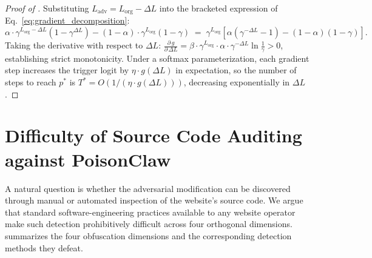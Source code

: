 \documentclass{article}
\begin{document}
\begin{proof}[Proof of ]
Substituting $L_{\mathrm{adv}} = L_{\mathrm{org}} - \Delta L$ into the bracketed expression of Eq.~\eqref{eq:gradient_decomposition}:
\begin{equation*}
    \alpha \cdot \gamma^{L_{\mathrm{org}} - \Delta L}(1-\gamma^{\Delta L})
    - (1-\alpha)\cdot\gamma^{L_{\mathrm{org}}}(1-\gamma)
    \;=\; \gamma^{L_{\mathrm{org}}}\!\left[
    \alpha(\gamma^{-\Delta L} - 1) - (1-\alpha)(1-\gamma)\right].
\end{equation*}
Taking the derivative with respect to $\Delta L$:
$\frac{\partial\, g}{\partial\, \Delta L}
    = \beta \cdot \gamma^{L_{\mathrm{org}}} \cdot \alpha \cdot
    \gamma^{-\Delta L} \ln \tfrac{1}{\gamma} > 0$,
establishing strict monotonicity. Under a softmax parameterization, each gradient step increases the trigger logit by $\eta \cdot g(\Delta L)$ in expectation, so the number of steps to reach $p^*$ is $T^* = O(1 / (\eta \cdot g(\Delta L)))$, decreasing exponentially in $\Delta L$.
\end{proof}


\section{Difficulty of Source Code Auditing against PoisonClaw}
\label{app:stealth}

A natural question is whether the adversarial modification can be discovered through manual or automated inspection of the website's source code.
We argue that standard software-engineering practices available to any website operator make such detection prohibitively difficult across four orthogonal dimensions.
 summarizes the four obfuscation dimensions and the corresponding detection methods they defeat.
\end{document}
